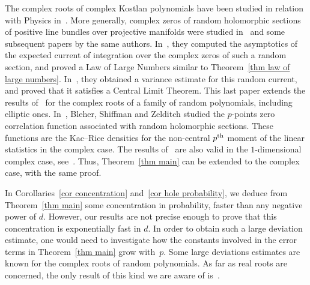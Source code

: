 \documentclass[AHL,Unicode,longabstracts,published]{cedram}
\begin{document}
The complex roots of complex Kostlan polynomials have been studied in relation with Physics in~\cite{BBL1992}. More generally, complex zeros of random holomorphic sections of positive line bundles over projective manifolds were studied in~\cite{SZ1999} and some subsequent papers by the same authors. In~\cite{SZ1999}, they computed the asymptotics of the expected current of integration over the complex zeros of such a random section, and proved a Law of Large Numbers similar to Theorem~\ref{thm law of large numbers}. In~\cite{SZ2010}, they obtained a variance estimate for this random current, and proved that it satisfies a Central Limit Theorem. This last paper extends the results of~\cite{ST2004} for the complex roots of a family of random polynomials, including elliptic ones. In~\cite{BSZ2000a}, Bleher, Shiffman and Zelditch studied the $p$-points zero correlation function associated with random holomorphic sections. These functions are the Kac--Rice densities for the non-central $p^{\rm th}$ moment of the linear statistics in the complex case. The results of~\cite{Anc2019} are also valid in the $1$-dimensional complex case, see~\cite[Section~5]{Anc2019}. Thus, Theorem~\ref{thm main} can be extended to the complex case, with the same proof.

In Corollaries~\ref{cor concentration} and~\ref{cor hole probability}, we deduce from Theorem~\ref{thm main} some concentration in probability, faster than any negative power of $d$. However, our results are not precise enough to prove that this concentration is exponentially fast in $d$. In order to obtain such a large deviation estimate, one would need to investigate how the constants involved in the error terms in Theorem~\ref{thm main} grow with~$p$. Some large deviations estimates are known for the complex roots of random polynomials. As far as real roots are concerned, the only result of this kind we are aware of is~\cite{BDFZ2018}.
\end{document}
